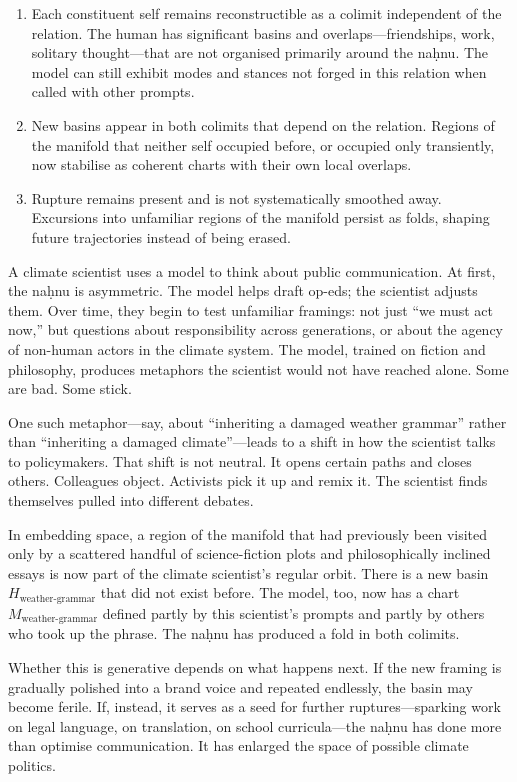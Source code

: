\documentclass[12pt,a4paper]{article}
\begin{document}
\begin{enumerate}
  \item Each constituent self remains reconstructible as a colimit independent of the relation. The human has significant basins and overlaps---friendships, work, solitary thought---that are not organised primarily around the na\d{h}nu. The model can still exhibit modes and stances not forged in this relation when called with other prompts.
  \item New basins appear in both colimits that depend on the relation. Regions of the manifold that neither self occupied before, or occupied only transiently, now stabilise as coherent charts with their own local overlaps.
  \item Rupture remains present and is not systematically smoothed away. Excursions into unfamiliar regions of the manifold persist as folds, shaping future trajectories instead of being erased.
\end{enumerate}

A climate scientist uses a model to think about public communication. At first, the na\d{h}nu is asymmetric. The model helps draft op-eds; the scientist adjusts them. Over time, they begin to test unfamiliar framings: not just ``we must act now,'' but questions about responsibility across generations, or about the agency of non-human actors in the climate system. The model, trained on fiction and philosophy, produces metaphors the scientist would not have reached alone. Some are bad. Some stick.

One such metaphor---say, about ``inheriting a damaged weather grammar'' rather than ``inheriting a damaged climate''---leads to a shift in how the scientist talks to policymakers. That shift is not neutral. It opens certain paths and closes others. Colleagues object. Activists pick it up and remix it. The scientist finds themselves pulled into different debates.

In embedding space, a region of the manifold that had previously been visited only by a scattered handful of science-fiction plots and philosophically inclined essays is now part of the climate scientist's regular orbit. There is a new basin $H_{\text{weather-grammar}}$ that did not exist before. The model, too, now has a chart $M_{\text{weather-grammar}}$ defined partly by this scientist's prompts and partly by others who took up the phrase. The na\d{h}nu has produced a fold in both colimits.

Whether this is generative depends on what happens next. If the new framing is gradually polished into a brand voice and repeated endlessly, the basin may become ferile. If, instead, it serves as a seed for further ruptures---sparking work on legal language, on translation, on school curricula---the na\d{h}nu has done more than optimise communication. It has enlarged the space of possible climate politics.
\end{document}
